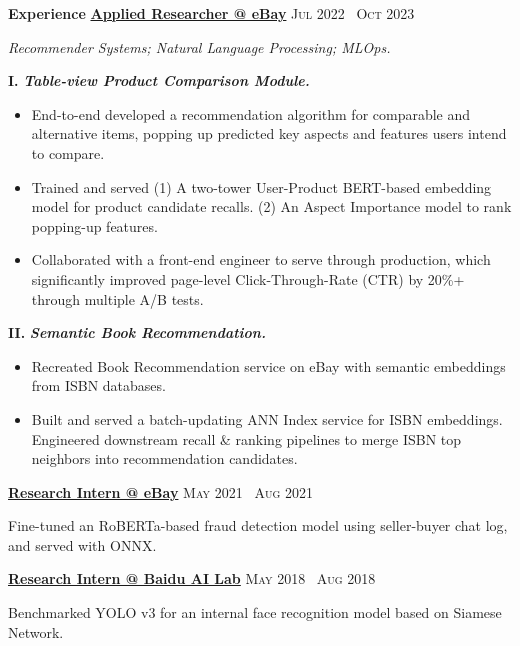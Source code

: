 \documentclass{resume} %
\begin{document}
\begin{rSection}{\Large \textbf{Experience}}
\vspace{1mm}
{\bf \large{{\underline{Applied Researcher @ eBay}}}}     \textsc{\hfill Jul 2022  \textendash\  Oct 2023}
\vspace{-2mm}

\large{\textsl{Recommender Systems; Natural Language Processing; MLOps.}} 
\vspace{-1mm}

\textbf{I.} \textsl{\bf Table-view Product Comparison Module.} 
\vspace{-1mm}
\begin{itemize}[noitemsep, topsep=-1pt, parsep=1pt, partopsep=0pt]
    \item End-to-end developed a recommendation algorithm for comparable and alternative items, popping up predicted key aspects and features users intend to compare. 
    \item Trained and served (1) A two-tower User-Product BERT-based embedding model for product candidate recalls. (2) An Aspect Importance model to rank popping-up features.
    \item Collaborated with a front-end engineer to serve through production, which significantly improved page-level Click-Through-Rate (CTR) by 20\%+ through multiple A/B tests.
\end{itemize}

\vspace{-1mm}
\textbf{II.} \textsl{\bf Semantic Book Recommendation.} 
\vspace{-2mm}
\begin{itemize}[noitemsep, topsep=-1pt, parsep=1pt, partopsep=0pt]
    \item Recreated Book Recommendation service on eBay with semantic embeddings from ISBN databases.
    \item Built and served a batch-updating ANN Index service for ISBN embeddings. Engineered downstream recall \& ranking pipelines to merge ISBN top neighbors into recommendation candidates.
\end{itemize}


{\bf \large{{\underline{Research Intern @ eBay}}}}     \textsc{\hfill May 2021  \textendash\  Aug 2021} 

\vspace{-2mm}
Fine-tuned an RoBERTa-based fraud detection model using seller-buyer chat log, and served with ONNX.

{\bf \large{{\underline{Research Intern @ Baidu AI Lab}}}}     \textsc{\hfill May 2018  \textendash\  Aug 2018} 

\vspace{-2mm}
Benchmarked YOLO v3 for an internal face recognition model based on Siamese Network.


\end{rSection}
\end{document}
